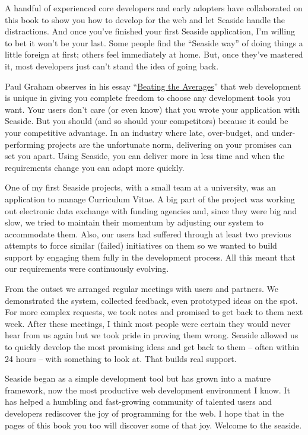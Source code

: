 \documentclass[a4paper,10pt,twoside]{book}
\begin{document}
A handful of experienced core developers and early adopters have collaborated on this book to show you how to develop for the web and let Seaside handle the distractions. And once you've finished your first Seaside application, I'm willing to bet it won't be your last. Some people find the ``Seaside way'' of doing things a little foreign at first; others feel immediately at home. But, once they've mastered it, most developers just can't stand the idea of going back.

Paul Graham observes in his essay ``\href{http://www.paulgraham.com/avg.html}{Beating the Averages}'' that web development is unique in giving you complete freedom to choose any development tools you want. Your users don't care (or even know) that you wrote your application with Seaside. But you should (and so should your competitors) because it could be your competitive advantage. In an industry where late, over-budget, and under-performing projects are the unfortunate norm, delivering on your promises can set you apart. Using Seaside, you can deliver more in less time and when the requirements change you can adapt more quickly.

One of my first Seaside projects, with a small team at a university, was an application to manage Curriculum Vitae. A big part of the project was working out electronic data exchange with funding agencies and, since they were big and slow, we tried to maintain their momentum by adjusting our system to accommodate them. Also, our users had suffered through at least two previous attempts to force similar (failed) initiatives on them so we wanted to build support by engaging them fully in the development process. All this meant that our requirements were continuously evolving.

From the outset we arranged regular meetings with users and partners. We demonstrated the system, collected feedback, even prototyped ideas on the spot. For more complex requests, we took notes and promised to get back to them next week. After these meetings, I think most people were certain they would never hear from us again but we took pride in proving them wrong. Seaside allowed us to quickly develop the most promising ideas and get back to them -- often within 24 hours -- with something to look at. That builds real support.

Seaside began as a simple development tool but has grown into a mature framework, now the most productive web development environment I know. It has helped a humbling and fast-growing community of talented users and developers rediscover the joy of programming for the web. I hope that in the pages of this book you too will discover some of that joy. Welcome to the seaside.
\end{document}
